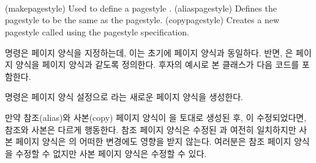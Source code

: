 \begin{plainlist}
\begin{syntax}
\cmd{\makepagestyle} \\
\cmd{\aliaspagestyle} \\
\cmd{\copypagestyle}\\
\end{syntax}
\glossary(makepagestyle)%
  {}%
  {Used to define a pagestyle .}
\glossary(aliaspagestyle)%
  {}%
  {Defines the  pagestyle to be the same as the 
  pagestyle.}
\glossary(copypagestyle)%
  {}%
  {Creates a new pagestyle called  using the 
   pagestyle specification.}

\cmd{\makepagestyle} 명령은  페이지 양식을 지정하는데, 이는 초기에
 페이지 양식과 동일하다.
반면, \cmd{\aliaspagestyle}은  페이지 양식을  페이지
양식과 같도록 정의한다.
후자의 예시로 본 클래스가 다음 코드를 포함한다.
\begin{lcode}
\end{lcode}
\cmd{\copypagestyle} 명령은  페이지 양식 설정으로 라는
새로운 페이지 양식을 생성한다.

만약 참조(alias)와 사본(copy) 페이지 양식이 을 토대로 생성된 후,
이 수정되었다면, 참조와 사본은 다르게 행동한다.
참조 페이지 양식은 수정된 과 여전히 일치하지만 사본 페이지
양식은 의 어떠한 변경에도 영향을 받지 않는다.
여러분은 참조 페이지 양식을 수정할 수 없지만 사본 페이지 양식은 수정할 수 있다.


\end{plainlist}
